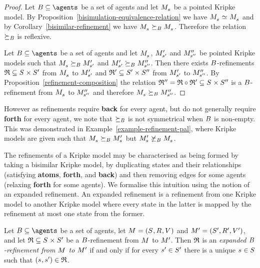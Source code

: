 \begin{proof}
Let $\agentsB \subseteq \agents$ be a set of agents and let $\kPModel{\kStateS}$ be a pointed Kripke model.
By Proposition~\ref{bisimulation-equivalence-relation} we have $\kPModel{\kStateS} \bisimilar \kPModel{\kStateS}$ and by Corollary~\ref{bisimilar-refinement} we have $\kPModel{\kStateS} \simulatesBs \kPModel{\kStateS}$.
Therefore the relation $\succeq_{B}$ is reflexive.

Let $\agentsB \subseteq \agents$ be a set of agents and let $\kPModel{\kStateS}$, ${M^{\prime}_{{s}^{\prime}}}$ and ${M^{\prime\prime}_{{s}^{\prime\prime}}}$ be pointed Kripke models such that $\kPModel{\kStateS} \simulatesBs \kPModelP{\kStateSP}$ and ${M^{\prime}_{{s}^{\prime}}} \succeq_{B} {M^{\prime\prime}_{{s}^{\prime\prime}}}$.
Then there exists $B$-refinements $\refinement \subseteq \kStates \times \kStatesP$ from $\kPModel{\kStateS}$ to ${M^{\prime}_{{s}^{\prime}}}$ and $\mathfrak{R}' \subseteq {S^{\prime}} \times {S^{\prime\prime}}$ from ${M^{\prime}_{{s}^{\prime}}}$ to ${M^{\prime\prime}_{{s}^{\prime\prime}}}$.
By Proposition~\ref{refinement-composition} the relation $\refinement'' = \refinement \circ \refinement' \subseteq \kStates \times \kStatesPP$ is a $B$-refinement from $\kPModel{\kStateS}$ to ${M^{\prime\prime}_{{s}^{\prime\prime}}}$ and therefore $\kPModel{\kStateS} \simulatesBs \kPModelPP{\kStateSPP}$.
\end{proof}

However as refinements require {\bf back} for every agent, but do not generally require {\bf forth} for every agent, we note that $\succeq_{B}$ is not symmetrical when $B$ is non-empty.
This was demonstrated in Example~\ref{example-refinement-pal}, where Kripke models are given such that  $\kPModel{\kStateS} \simulatesBs \kPModelP{\kStateS}$ but $\kPModelP{\kStateS} \not\simulatesBs \kPModel{\kStateS}$.

The refinements of a Kripke model may be characterised as being formed by taking a bisimilar Kripke model, by duplicating states and their relationships (satisfying {\bf atoms}, {\bf forth}, and {\bf back}) and then removing edges for some agents (relaxing {\bf forth} for some agents).
We formalise this intuition using the notion of an expanded refinement.
An expanded refinement is a refinement from one Kripke model to another Kripke model where every state in the latter is mapped by the refinement at most one state from the former.

\begin{definition}\label{expanded-refinement}
Let $\agentsB \subseteq \agents$ be a set of agents, let $\kModelAndTuple$ and $\kModelAndTupleP$, and let $\refinement \subseteq \kStates \times \kStatesP$ be a $B$-refinement from $\kModel$ to ${M^{\prime}_{}}$.
Then $\mathfrak{R}$ is an {\em expanded $B$-refinement from $\kModel$ to ${M^{\prime}_{}}$} if and only if for every ${s}^{\prime} \in {S^{\prime}}$ there is a unique $\kStateS \in \kStates$ such that $(\kStateS, \kStateSP) \in \refinement$.
\end{definition}

